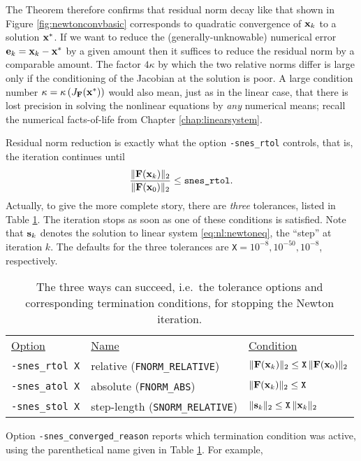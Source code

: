 The Theorem therefore confirms that residual norm decay like that shown in Figure \ref{fig:newtonconvbasic} corresponds to quadratic convergence of $\mathbf{x}_k$ to a solution $\mathbf{x}^*$.  If we want to reduce the (generally-unknowable) numerical error $\mathbf{e}_k=\mathbf{x}_k-\mathbf{x}^*$ by a given amount then it suffices to reduce the residual norm by a comparable amount.  The factor $4 \kappa$ by which the two relative norms differ is large only if the conditioning of the Jacobian at the solution is poor.  A large condition number $\kappa=\kappa\left(J_{\mathbf{F}}(\mathbf{x}^*)\right)$ would also mean, just as in the linear case, that there is lost precision in solving the nonlinear equations by \emph{any} numerical means; recall the numerical facts-of-life from Chapter \ref{chap:linearsystem}.

Residual norm reduction is exactly what the option \texttt{-snes\_rtol} controls, that is, the iteration continues until
    $$\frac{\|\mathbf{F}(\mathbf{x}_k)\|_2}{\|\mathbf{F}(\mathbf{x}_0)\|_2} \le \text{\texttt{snes\_rtol}}.$$
Actually, to give the more complete story, there are \emph{three} \pSNES tolerances, listed in Table \ref{tab:snestolerances}.  The iteration stops as soon as one of these conditions is satisfied.  Note that $\mathbf{s}_k$ denotes the solution to linear system \eqref{eq:nl:newtoneq}, the ``step'' at iteration $k$.  The defaults for the three tolerances are \texttt{X}$=10^{-8},10^{-50},10^{-8}$, respectively.

\begin{table}
\begin{tabular}{lll}
\underline{Option}\hspace{0.2in} & \underline{Name}\hspace{0.2in} & \underline{Condition}\hspace{0.2in} \\
\texttt{-snes\_rtol X} & relative (\texttt{FNORM\_RELATIVE}) & $\|\mathbf{F}(\mathbf{x}_k)\|_2 \le \text{\texttt{X}}\, \|\mathbf{F}(\mathbf{x}_0)\|_2$ \\
\texttt{-snes\_atol X} & absolute (\texttt{FNORM\_ABS}) & $\|\mathbf{F}(\mathbf{x}_k)\|_2 \le \text{\texttt{X}}$ \\
\texttt{-snes\_stol X} & step-length (\texttt{SNORM\_RELATIVE}) & $\|\mathbf{s}_k\|_2 \le \text{\texttt{X}}\, \|\mathbf{x}_k\|_2$
\end{tabular}
\caption{The three ways \pSNES can succeed, i.e.~the tolerance options and corresponding termination conditions, for stopping the Newton iteration.} \label{tab:snestolerances}
\end{table}

\medskip
Option \texttt{-snes\_converged\_reason} reports which termination condition was active, using the parenthetical name given in Table \ref{tab:snestolerances}.  For example,

